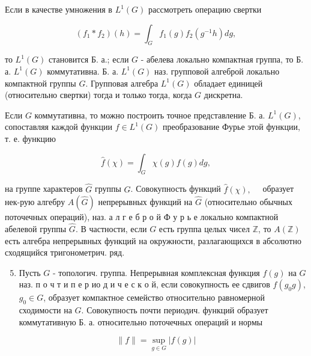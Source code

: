 \documentclass[10pt]{article}
\begin{document}
Если в качестве умножения в $L^{1}(G)$ рассмотреть операцию свертки



\[

\left(f_{1} * f_{2}\right)(h)=\int_{G} f_{1}(g) f_{2}\left(g^{-1} h\right) d g,

\]



то $L^{1}(G)$ становится Б. а.; если $G$ - абелева локально компактная группа, то Б. а. $L^{1}(G)$ коммутативна. Б. а. $L^{1}(G)$ наз. групповой алгеброй локально компактной группы $G$. Групповая алгебра $L^{1}(G)$ обладает единицей (относительно свертки) тогда и только тогда, когда $G$ дискретна.



Если $G$ коммутативна, то можно построить точное представление Б. а. $L^{1}(G)$, сопоставляя каждой функции $f \in L^{1}(G)$ преобразование Фурье этой функции, т. е. функцию



\[

\hat{f}(\chi)=\int_{G} \chi(g) f(g) d g,

\]



на группе характеров $\widehat{G}$ группы $G$. Совокупность функций $\hat{f}(\chi), \quad$ образует нек-рую алгебру $A(\widehat{G})$ непрерывных функций на $\hat{G}$ (относительно обычных поточечных операций), наз. а л г е б р о й Ф у р ь е локально компактной абелевой группы $\hat{G}$. В частности, если $G$ есть группа целых чисел $\mathbb{Z}$, то $A(\mathbb{Z})$ есть алгебра непрерывных функций на окружности, разлагающихся в абсолютно сходящийся тригонометрич. ряд.



\begin{enumerate}

  \setcounter{enumi}{4}

  \item Пусть $G$ - топологич. группа. Непрерывная комплексная функция $f(g)$ на $G$ наз. п о ч т и п е р ио д и ч е с к о й, если совокупность ее сдвигов $f\left(g_{0} g\right)$, $g_{0} \in G$, образует компактное семейство относительно равномерной сходимости на $G$. Совокупность почти периодич. функций образует коммутативную Б. а. относительно поточечных операций и нормы

\end{enumerate}



\[

\|f\|=\sup _{g \in G}|f(g)|

\]
\end{document}
